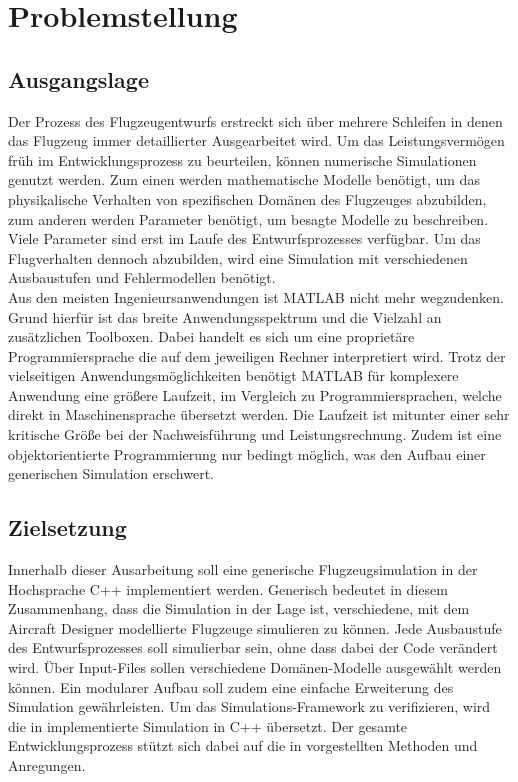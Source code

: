 \chapter{Problemstellung}
\section{Ausgangslage}
\label{sec:ausgangslage}
Der Prozess des Flugzeugentwurfs erstreckt sich über mehrere Schleifen in denen das Flugzeug immer detaillierter Ausgearbeitet wird. Um das Leistungsvermögen früh im Entwicklungsprozess zu beurteilen, können numerische Simulationen genutzt werden. Zum einen werden mathematische Modelle benötigt, um das physikalische Verhalten von spezifischen Domänen des Flugzeuges abzubilden, zum anderen werden Parameter benötigt, um besagte Modelle zu beschreiben. Viele Parameter sind erst im Laufe des Entwurfsprozesses verfügbar. Um das Flugverhalten dennoch abzubilden, wird eine Simulation mit verschiedenen Ausbaustufen und Fehlermodellen benötigt.  \\
Aus den meisten Ingenieursanwendungen ist MATLAB nicht mehr wegzudenken. Grund hierfür ist das breite Anwendungsspektrum und die Vielzahl an zusätzlichen Toolboxen. Dabei handelt es sich um eine proprietäre Programmiersprache die auf dem jeweiligen Rechner interpretiert wird. Trotz der vielseitigen Anwendungsmöglichkeiten benötigt MATLAB für komplexere Anwendung eine größere Laufzeit, im Vergleich zu Programmiersprachen, welche direkt in Maschinensprache übersetzt werden. Die Laufzeit ist mitunter einer sehr kritische Größe bei der Nachweisführung und Leistungsrechnung. Zudem ist eine objektorientierte Programmierung nur bedingt möglich, was den Aufbau einer generischen Simulation erschwert.
 
\section{Zielsetzung}
Innerhalb dieser Ausarbeitung soll eine generische Flugzeugsimulation in der Hochsprache C++ implementiert werden. Generisch bedeutet in diesem Zusammenhang, dass die Simulation in der Lage ist, verschiedene, mit dem Aircraft Designer modellierte Flugzeuge simulieren zu können. Jede Ausbaustufe des Entwurfsprozesses soll simulierbar sein, ohne dass dabei der Code verändert wird. Über Input-Files sollen verschiedene Domänen-Modelle ausgewählt werden können.  Ein modularer Aufbau soll zudem eine einfache Erweiterung des Simulation gewährleisten. Um das Simulations-Framework zu verifizieren, wird die in \cite{Olucak.15.02.2017} implementierte Simulation in C++ übersetzt. Der gesamte Entwicklungsprozess stützt sich dabei auf die in \cite{Kessler.Sommersemester2017} vorgestellten Methoden und Anregungen.
 
